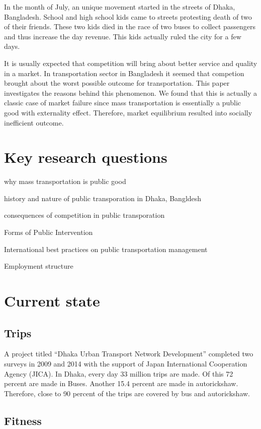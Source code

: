 \documentclass[11pt,]{article}
\begin{document}
In the month of July, an unique movement started in the streets of
Dhaka, Bangladesh. School and high school kids came to streets
protesting death of two of their friends. These two kids died in the
race of two buses to collect passengers and thus increase the day
revenue. This kids actually ruled the city for a few days.

It is usually expected that competition will bring about better service
and quality in a market. In transportation sector in Bangladesh it
seemed that competion brought about the worst possible outcome for
transportation. This paper investigates the reasons behind this
phenomenon. We found that this is actually a classic case of market
failure since mass transportation is essentially a public good with
externality effect. Therefore, market equilibrium resulted into socially
inefficient outcome.

\section{Key research questions}\label{key-research-questions}

why mass transportation is public good

history and nature of public transporation in Dhaka, Bangldesh

consequences of competition in public transporation

Forms of Public Intervention

International best practices on public transportation management

Employment structure

\section{Current state}\label{current-state}

\subsection{Trips}\label{trips}

A project titled ``Dhaka Urban Transport Network Development'' completed
two surveys in 2009 and 2014 with the support of Japan International
Cooperation Agency (JICA). In Dhaka, every day 33 million trips are
made. Of this 72 percent are made in Buses. Another 15.4 percent are
made in autorickshaw. Therefore, close to 90 percent of the trips are
covered by bus and autorickshaw.

\subsection{Fitness}\label{fitness}
\end{document}
